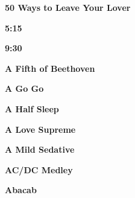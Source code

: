 \newline
\vspace{10pt} 
\begin{center}\textbf{50 Ways to Leave Your Lover}\end{center}
\newline
\vspace{10pt} 
\begin{center}\textbf{5:15}\end{center}
\newline
\vspace{10pt} 
\begin{center}\textbf{9:30}\end{center}
\newline
\vspace{10pt} 
\begin{center}\textbf{A Fifth of Beethoven}\end{center}
\newline
\vspace{10pt} 
\begin{center}\textbf{A Go Go}\end{center}
\newline
\vspace{10pt} 
\begin{center}\textbf{A Half Sleep}\end{center}
\newline
\vspace{10pt} 
\begin{center}\textbf{A Love Supreme}\end{center}
\newline
\vspace{10pt} 
\begin{center}\textbf{A Mild Sedative}\end{center}
\newline
\vspace{10pt} 
\begin{center}\textbf{AC/DC Medley}\end{center}
\newline
\vspace{10pt} 
\begin{center}\textbf{Abacab}\end{center}
